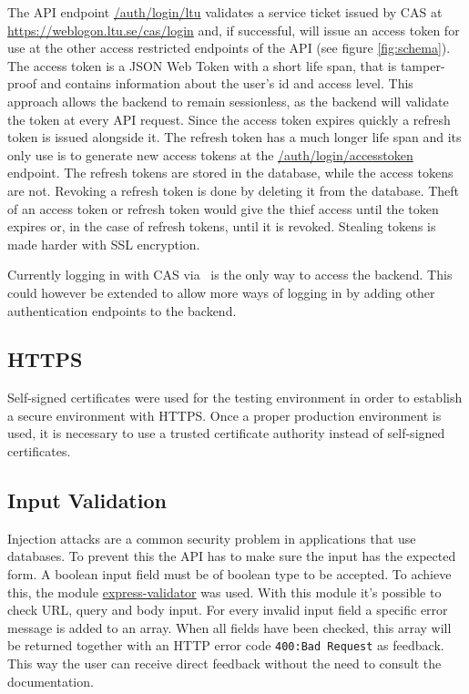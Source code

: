 The API endpoint \url{/auth/login/ltu} validates a service ticket issued by CAS at \url{https://weblogon.ltu.se/cas/login} and, if successful, will issue an access token for use at the other access restricted endpoints of the API (see figure \ref{fig:schema}). The access token is a JSON Web Token with a short life span, that is tamper-proof and contains information about the user's id and access level. This approach allows the backend to remain sessionless, as the backend will validate the token at every API request. Since the access token expires quickly a refresh token is issued alongside it. The refresh token has a much longer life span and its only use is to generate new access tokens at the \url{/auth/login/accesstoken} endpoint. The refresh tokens are stored in the database, while the access tokens are not. Revoking a refresh token is done by deleting it from the database. Theft of an access token or refresh token would give the thief access until the token expires or, in the case of refresh tokens, until it is revoked. Stealing tokens is made harder with SSL encryption.

Currently logging in with CAS via \LTU\ is the only way to access the backend. This could however be extended to allow more ways of logging in by adding other authentication endpoints to the backend.

\subsection{HTTPS} \label{https}
Self-signed certificates were used for the testing environment in order to establish a secure environment with HTTPS. Once a proper production environment is used, it is necessary to use a trusted certificate authority instead of self-signed certificates.

\subsection{Input Validation}
Injection attacks are a common security problem in applications that use databases. To prevent this the API has to make sure the input has the expected form. A boolean input field must be of boolean type to be accepted. To achieve this, the module \href{https://github.com/ctavan/express-validator}{express-validator} was used. With this module it's possible to check URL, query and body input. For every invalid input field a specific error message is added to an array. When all fields have been checked, this array will be returned together with an HTTP error code \texttt{400:\@ Bad Request} as feedback. This way the user can receive direct feedback without the need to consult the documentation.

